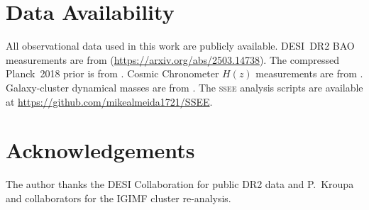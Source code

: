 \documentclass[12pt,a4paper]{article}
\begin{document}
\section*{Data Availability}
All observational data used in this work are publicly available.
DESI~DR2 BAO measurements are from \citet{DESI_DR2}
(\url{https://arxiv.org/abs/2503.14738}).
The compressed Planck~2018 prior is from \citet{Planck2018}.
Cosmic Chronometer $H(z)$ measurements are from \citet{Moresco2022}.
Galaxy-cluster dynamical masses are from \citet{Zhang2026}.
The \textsc{ssee} analysis scripts are available at
\url{https://github.com/mikealmeida1721/SSEE}.

\section*{Acknowledgements}
The author thanks the DESI Collaboration for public DR2 data and
P.~Kroupa and collaborators for the IGIMF cluster re-analysis.
\end{document}
